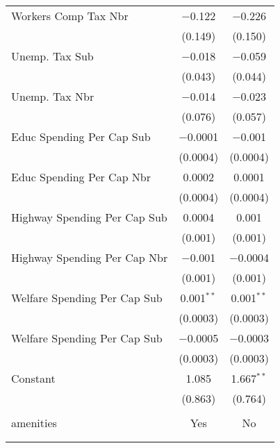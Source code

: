 \begin{table}[!htbp]
\begin{tabular}{@{\extracolsep{5pt}}lcc}
  Workers Comp Tax Nbr & $-$0.122 & $-$0.226 \\ 
  & (0.149) & (0.150) \\ 
  Unemp. Tax Sub & $-$0.018 & $-$0.059 \\ 
  & (0.043) & (0.044) \\ 
  Unemp. Tax Nbr & $-$0.014 & $-$0.023 \\ 
  & (0.076) & (0.057) \\ 
  Educ Spending Per Cap Sub & $-$0.0001 & $-$0.001 \\ 
  & (0.0004) & (0.0004) \\ 
  Educ Spending Per Cap Nbr & 0.0002 & 0.0001 \\ 
  & (0.0004) & (0.0004) \\ 
  Highway Spending Per Cap Sub & 0.0004 & 0.001 \\ 
  & (0.001) & (0.001) \\ 
  Highway Spending Per Cap Nbr & $-$0.001 & $-$0.0004 \\ 
  & (0.001) & (0.001) \\ 
  Welfare Spending Per Cap Sub & 0.001$^{**}$ & 0.001$^{**}$ \\ 
  & (0.0003) & (0.0003) \\ 
  Welfare Spending Per Cap Sub & $-$0.0005 & $-$0.0003 \\ 
  & (0.0003) & (0.0003) \\ 
  Constant & 1.085 & 1.667$^{**}$ \\ 
  & (0.863) & (0.764) \\ 
 \hline \\[-1.8ex] 
amenities & Yes & No \\ 
\hline \\[-1.8ex] 
\hline 
\hline \\[-1.8ex] 
\end{tabular} 
\end{table} 
